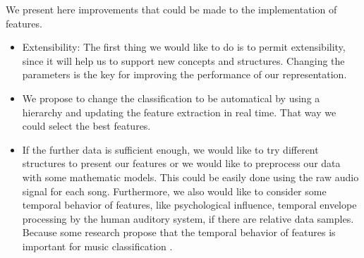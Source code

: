\documentclass[a4paper,12pt]{article}
\begin{document}
We present here improvements that could be made to the implementation of features.

\begin{itemize}
    \item Extensibility: The first thing we would like to do is to permit extensibility, since it will help us to support new concepts and structures. Changing the parameters is the key for improving the performance of our representation.
    \item We propose to change the classification to be automatical by using a hierarchy and updating the feature extraction in real time. That way we could select the best features.
    \item If the further data is sufficient enough, we would like to try different structures to present our features or we would like to preprocess our data with some mathematic models. This could be easily done using the raw audio signal for each song. Furthermore, we also would like to consider some temporal behavior of features, like psychological influence, temporal envelope processing by the human auditory system, if there are relative data samples. Because some research propose that the temporal behavior of features is important for music classification \cite{mckinney2003features}.
\end{itemize}


\end{document}
